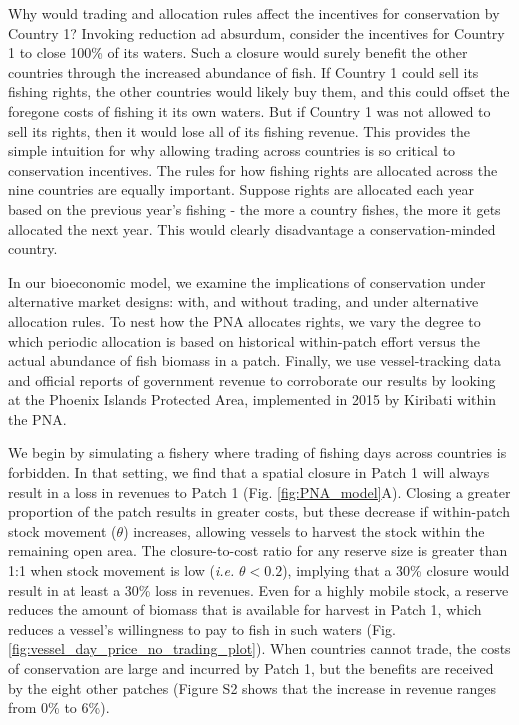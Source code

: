\documentclass[12pt]{article}
\begin{document}
Why would trading and allocation rules affect the incentives for conservation by Country 1?  Invoking reduction ad absurdum, consider the incentives for Country 1 to close 100\% of its waters. Such a closure would surely benefit the other countries through the increased abundance of fish.  If Country 1 could sell its fishing rights, the other countries would likely buy them, and this could offset the foregone costs of fishing it its own waters. But if Country 1 was not allowed to sell its rights, then it would lose all of its fishing revenue.  This provides the simple intuition for why allowing trading across countries is so critical to conservation incentives. The rules for how fishing rights are allocated across the nine countries are equally important. Suppose rights are allocated each year based on the previous year's fishing - the more a country fishes, the more it gets allocated the next year.  This would clearly disadvantage a conservation-minded country.

In our bioeconomic model, we examine the implications of conservation under alternative market designs: with, and without trading, and under alternative allocation rules. To nest how the PNA allocates rights, we vary the degree to which periodic allocation is based on historical within-patch effort versus the actual abundance of fish biomass in a patch. Finally, we use vessel-tracking data and official reports of government revenue to corroborate our results by looking at the Phoenix Islands Protected Area, implemented in 2015 by Kiribati within the PNA. 

We begin by simulating a fishery where trading of fishing days across countries is forbidden. In that setting, we find that a spatial closure in Patch 1 will always result in a loss in revenues to Patch 1 (Fig. \ref{fig:PNA_model}A). Closing a greater proportion of the patch results in greater costs, but these decrease if within-patch stock movement ($\theta$) increases, allowing vessels to harvest the stock within the remaining open area. The closure-to-cost ratio for any reserve size is greater than 1:1 when stock movement is low (\emph{i.e.} $\theta < 0.2$), implying that a 30\% closure would result in at least a 30\% loss in revenues. Even for a highly mobile stock, a reserve reduces the amount of biomass that is available for harvest in Patch 1, which reduces a vessel's willingness to pay to fish in such waters (Fig. \ref{fig:vessel_day_price_no_trading_plot}). When countries cannot trade, the costs of conservation are large and incurred by Patch 1, but the benefits are received by the eight other patches (Figure S2 shows that the increase in revenue ranges from 0\% to 6\%).
\end{document}
